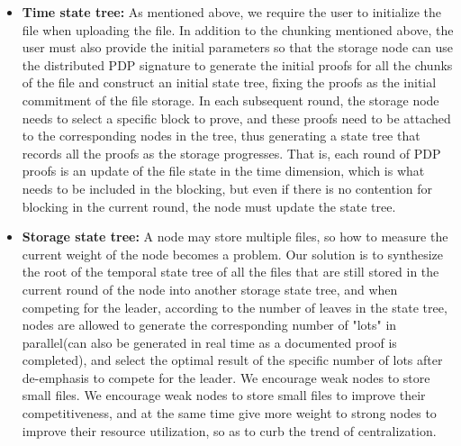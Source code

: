 \documentclass[journal]{IEEEtran}
\begin{document}
\begin{itemize}
    \item \textbf{Time state tree: }
    As mentioned above, we require the user to initialize the file when uploading the file. In addition to the chunking mentioned above, the user must also provide the initial parameters so that the storage node can use the distributed PDP signature to generate the initial proofs for all the chunks of the file and construct an initial state tree, fixing the proofs as the initial commitment of the file storage. In each subsequent round, the storage node needs to select a specific block to prove, and these proofs need to be attached to the corresponding nodes in the tree, thus generating a state tree that records all the proofs as the storage progresses. That is, each round of PDP proofs is an update of the file state in the time dimension, which is what needs to be included in the blocking, but even if there is no contention for blocking in the current round, the node must update the state tree.
    \item \textbf{Storage state tree: }
    A node may store multiple files, so how to measure the current weight of the node becomes a problem. Our solution is to synthesize the root of the temporal state tree of all the files that are still stored in the current round of the node into another storage state tree, and when competing for the leader, according to the number of leaves in the state tree, nodes are allowed to generate the corresponding number of "lots" in parallel(can also be generated in real time as a documented proof is completed), and select the optimal result of the specific number of lots after de-emphasis to compete for the leader. We encourage weak nodes to store small files. We encourage weak nodes to store small files to improve their competitiveness, and at the same time give more weight to strong nodes to improve their resource utilization, so as to curb the trend of centralization.
\end{itemize}
\end{document}
